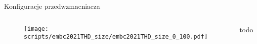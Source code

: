 


\begin{frame}{Konfiguracje przedwzmacniacza}


    \begin{columns}

        \begin{block}{}


            \begin{figure}[H]
                \centering
                \texttt{[image: scripts/embc2021THD\_size/embc2021THD\_size\_0\_100.pdf]}
            \end{figure}   
        \end{block}

\begin{block}{todo}
    
\end{block}
\end{columns}

\end{frame}


  

